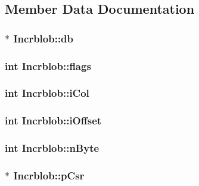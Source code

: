 \subsection{Member Data Documentation}
\hypertarget{struct_incrblob_a9d3fe0b0229b75b9d0f9ee8e6545b5bc}{
\subsubsection[{db}]{$\ast$ Incrblob\-::db}}\label{struct_incrblob_a9d3fe0b0229b75b9d0f9ee8e6545b5bc}
\hypertarget{struct_incrblob_a46fa093e5241305f28d02926f8d0846f}{
\subsubsection[{flags}]{\setlength{\rightskip}{0pt plus 5cm}int Incrblob\-::flags}}\label{struct_incrblob_a46fa093e5241305f28d02926f8d0846f}
\hypertarget{struct_incrblob_a398a322b061fb9952bc155026976ba51}{
\subsubsection[{i\-Col}]{\setlength{\rightskip}{0pt plus 5cm}int Incrblob\-::i\-Col}}\label{struct_incrblob_a398a322b061fb9952bc155026976ba51}
\hypertarget{struct_incrblob_af8e71744f43178967460b9f402e7fafd}{
\subsubsection[{i\-Offset}]{\setlength{\rightskip}{0pt plus 5cm}int Incrblob\-::i\-Offset}}\label{struct_incrblob_af8e71744f43178967460b9f402e7fafd}
\hypertarget{struct_incrblob_ab1e1439df086208173fa97003f0ee02b}{
\subsubsection[{n\-Byte}]{\setlength{\rightskip}{0pt plus 5cm}int Incrblob\-::n\-Byte}}\label{struct_incrblob_ab1e1439df086208173fa97003f0ee02b}
\hypertarget{struct_incrblob_af5a24b18473d1449c8c3fe7d826de59a}{
\subsubsection[{p\-Csr}]{$\ast$ Incrblob\-::p\-Csr}}\label{struct_incrblob_af5a24b18473d1449c8c3fe7d826de59a}
